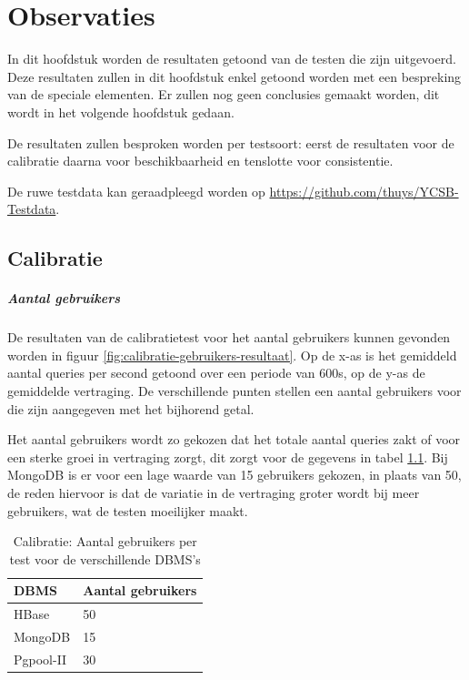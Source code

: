 \chapter{Observaties}
In dit hoofdstuk worden de resultaten getoond van de testen die zijn uitgevoerd. Deze resultaten zullen in dit hoofdstuk enkel getoond worden met een bespreking van de speciale elementen. Er zullen nog geen conclusies gemaakt worden, dit wordt in het volgende hoofdstuk gedaan. 

De resultaten zullen besproken worden per testsoort: eerst de resultaten voor de calibratie daarna voor beschikbaarheid en tenslotte voor consistentie. 

De ruwe testdata kan geraadpleegd worden op \url{https://github.com/thuys/YCSB-Testdata}. 

\section{Calibratie}

\paragraph{Aantal gebruikers}
De resultaten van de calibratietest voor het aantal gebruikers kunnen gevonden worden in figuur \ref{fig:calibratie-gebruikers-resultaat}. Op de x-as is het gemiddeld aantal queries per second getoond over een periode van 600s, op de y-as de gemiddelde vertraging. De verschillende punten stellen een aantal gebruikers voor die zijn aangegeven met het bijhorend getal. 

Het aantal gebruikers wordt zo gekozen dat het totale aantal queries zakt of voor een sterke groei in vertraging zorgt, dit zorgt voor de gegevens in tabel \ref{table:calibratie-gebruikers-resultaat}. Bij MongoDB is er voor een lage waarde van 15 gebruikers gekozen, in plaats van 50, de reden hiervoor is dat de variatie in de vertraging groter wordt bij meer gebruikers, wat de testen moeilijker maakt.  

\begin{table}[h!]
	\centering
	\begin{tabular}{l| l }
		\textbf{DBMS} & Aantal gebruikers \\
		\hline
		HBase & 50 \\
		MongoDB & 15\\
		Pgpool-II & 30\\
	\end{tabular}
	\caption{Calibratie: Aantal gebruikers per test voor de verschillende DBMS's}
	\label{table:calibratie-gebruikers-resultaat}
\end{table}

